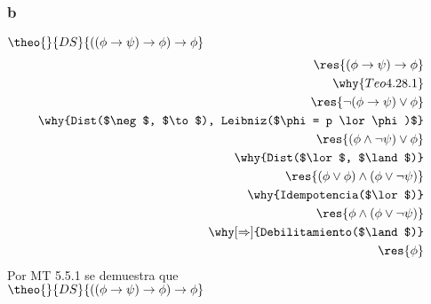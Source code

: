 \documentclass[twoside]{article}
\begin{document}
\subsubsection{b}
\begin{logicenv}{$\theo{}{DS}{((\phi \to \psi) \to \phi) \to \phi}$}
    \begin{align*}
            \res{(\phi \to \psi) \to \phi}\\
        \why{Teo 4.28.1}\\
            \res{\neg(\phi \to \psi) \lor \phi}\\
        \why{Dist($\neg$, $\to$), Leibniz($\phi = p \lor \phi)$}\\
            \res{(\phi \land \neg \psi) \lor \phi}\\
        \why{Dist($\lor$, $\land$)}\\
            \res{(\phi \lor \phi) \land (\phi \lor \neg \psi)}\\
        \why{Idempotencia($\lor$)}\\
            \res{\phi \land (\phi \lor \neg \psi)}\\
        \why[\Rightarrow]{Debilitamiento($\land$)}\\
            \res{\phi}
    \end{align*}
    Por MT 5.5.1 se demuestra que\\
    $\theo{}{DS}{((\phi \to \psi) \to \phi) \to \phi}$
\end{logicenv}
\end{document}
